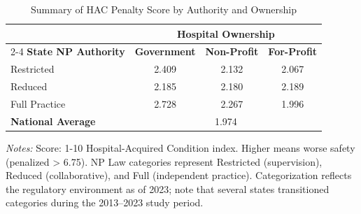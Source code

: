 \begin{table}[htbp]
    \centering
    \caption{Summary of HAC Penalty Score by Authority and Ownership}
    \label{tab:hac_total_score}
    \vspace{0.2cm}
    \begin{tabular}{lccc}
        \toprule
        & \multicolumn{3}{c}{\textbf{Hospital Ownership}} \\
        \cmidrule(lr){2-4}
        \textbf{State NP Authority} & \textbf{Government} & \textbf{Non-Profit} & \textbf{For-Profit} \\
        \midrule
        Restricted & 2.409 & 2.132 & 2.067 \\
        Reduced & 2.185 & 2.180 & 2.189 \\
        Full Practice & 2.728 & 2.267 & 1.996 \\
        \midrule
        \textbf{National Average} & \multicolumn{3}{c}{1.974} \\
        \bottomrule
    \end{tabular}
    \vspace{0.1cm}
    \begin{minipage}{0.85\textwidth}
        \footnotesize \textit{Notes:} Score: 1-10 Hospital-Acquired Condition index. Higher means worse safety (penalized > 6.75). NP Law categories represent Restricted (supervision), Reduced (collaborative), and Full (independent practice). Categorization reflects the regulatory environment as of 2023; note that several states transitioned categories during the 2013--2023 study period.
    \end{minipage}
\end{table}